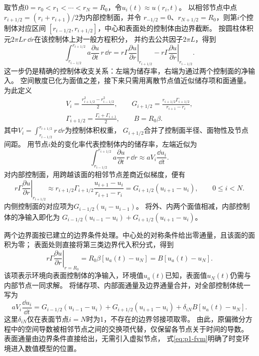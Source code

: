 取节点$0=r_0<r_1<\cdots<r_N=R_0$，令$u_i(t)\approx u(r_i,t)$。
以相邻节点中点$r_{i+1/2}=(r_i+r_{i+1})/2$为内部控制面，并令
$r_{-1/2}=0$、$r_{N+1/2}=R_0$，则第$i$个控制体对应区间
$[r_{i-1/2},r_{i+1/2}]$，中心和表面处的控制体由边界截断。
按圆柱体积元$2\pi Lr\,\dd r$在该控制体上对一般方程积分，
并约去公共因子$2\pi L$，得到
\begin{equation*}
  \int_{r_{i-1/2}}^{r_{i+1/2}}
    a\frac{\partial u}{\partial t}\,r\,\dd r
  =\left.r\Gamma\frac{\partial u}{\partial r}\right|_{r_{i+1/2}}
   -\left.r\Gamma\frac{\partial u}{\partial r}\right|_{r_{i-1/2}}.
\end{equation*}
这一步仍是精确的控制体收支关系：左端为储存率，右端为通过两个控制面的净输入。
空间散度已化为面值之差，接下来只需用离散节点值近似储存项和面通量。
为此定义
\begin{equation}
\begin{gathered}
  V_i=\frac{r_{i+1/2}^{2}-r_{i-1/2}^{2}}{2},\qquad
  G_{i+1/2}=\frac{r_{i+1/2}\Gamma_{i+1/2}}{r_{i+1}-r_i},\\
  \Gamma_{i+1/2}=\frac{\Gamma_i+\Gamma_{i+1}}{2},\qquad B=R_0\beta.
\end{gathered}
\label{eq:p1-fvm-coefficients}
\end{equation}
其中$V_i=\int_{r_{i-1/2}}^{r_{i+1/2}}r\,\dd r$为控制体积权重，
$G_{i+1/2}$合并了控制面半径、面物性及节点间距。
用节点$i$处的变化率代表控制体内的储存率，左端近似为
\begin{equation*}
  \int_{r_{i-1/2}}^{r_{i+1/2}}
    a\frac{\partial u}{\partial t}\,r\,\dd r
  \approx aV_i\frac{\dd u_i}{\dd t}.
\end{equation*}
对内部控制面，用跨越该面的相邻节点差商近似梯度，便有
\begin{equation*}
  \left.r\Gamma\frac{\partial u}{\partial r}\right|_{r_{i+1/2}}
  \approx
  r_{i+1/2}\Gamma_{i+1/2}\frac{u_{i+1}-u_i}{r_{i+1}-r_i}
  =G_{i+1/2}(u_{i+1}-u_i),\qquad 0\le i<N.
\end{equation*}
内侧控制面的对应项为$G_{i-1/2}(u_i-u_{i-1})$。
将外、内两个面值相减，内部控制体的净输入即化为
$G_{i-1/2}(u_{i-1}-u_i)+G_{i+1/2}(u_{i+1}-u_i)$。

两个边界面按已建立的边界条件处理。中心处的对称条件给出零通量，且该面的面积为零；
表面处则直接将第三类边界代入积分式，得到
\begin{equation*}
  \left.r\Gamma\frac{\partial u}{\partial r}\right|_{r=R_0}
  =R_0\beta[u_a(t)-u_N]
  =B[u_a(t)-u_N].
\end{equation*}
该项表示环境向表面控制体的净输入，环境值$u_a(t)$已知，表面值$u_N(t)$仍需与内部节点一同求解。
将储存项、内部面通量及边界通量合并，对全部控制体统一写为
\begin{equation}
  aV_i\frac{\dd u_i}{\dd t}
  =G_{i-1/2}(u_{i-1}-u_i)+G_{i+1/2}(u_{i+1}-u_i)
    +\delta_{iN}B[u_a(t)-u_N].
  \label{eq:p1-fvm}
\end{equation}
这里$\delta_{iN}$仅在表面节点$i=N$时为1，不存在的边界邻接项取零。
由此，原偏微分方程中的空间导数被相邻节点之间的交换项代替，仅保留各节点关于时间的导数。
表面通量由边界条件直接给出，无需引入虚拟节点，
式\eqref{eq:p1-fvm}明确了时变环境进入数值模型的位置。

